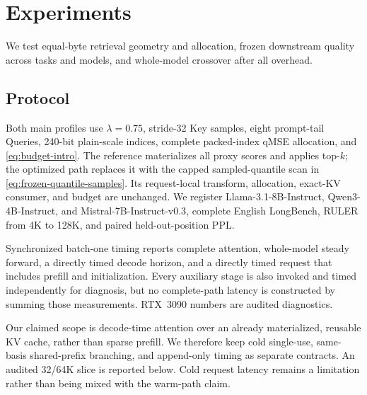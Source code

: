 \section{Experiments}
\label{sec:experiments}


We test equal-byte retrieval geometry and allocation, frozen downstream
quality across tasks and models, and whole-model crossover after all
overhead.

\subsection{Protocol}

Both main profiles use $\lambda=0.75$, stride-32 Key samples, eight
prompt-tail Queries, 240-bit plain-scale indices, complete packed-index
qMSE allocation, and \cref{eq:budget-intro}.  The reference materializes all
proxy scores and applies top-$k$; the optimized path replaces it with the
capped sampled-quantile scan in \cref{eq:frozen-quantile-samples}.  Its
request-local transform, allocation, exact-KV consumer, and budget are
unchanged.  We register Llama-3.1-8B-Instruct,
Qwen3-4B-Instruct, and
Mistral-7B-Instruct-v0.3, complete English LongBench, RULER from 4K to
128K, and paired held-out-position PPL.

Synchronized batch-one timing reports complete attention, whole-model steady
forward, a directly timed decode horizon, and a directly timed request that
includes prefill and initialization.  Every auxiliary stage is also invoked
and timed independently for diagnosis, but no complete-path latency is
constructed by summing those measurements.  RTX~3090 numbers are audited
diagnostics.

Our claimed scope is decode-time attention over an already materialized,
reusable KV cache, rather than sparse prefill.  We therefore keep cold
single-use, same-basis shared-prefix branching, and append-only timing as
separate contracts.  An audited 32/64K slice is reported below.
Cold request
latency remains a limitation rather than being mixed with the warm-path claim.

